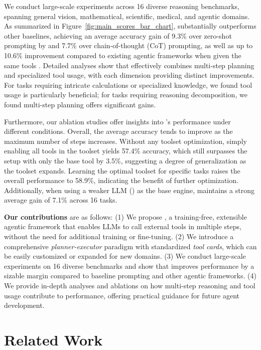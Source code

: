 We conduct large-scale experiments across 16 diverse reasoning benchmarks, spanning general vision, mathematical, scientific, medical, and agentic domains. As summarized in Figure~\ref{fig:main_scores_bar_chart}, \model substantially outperforms other baselines, achieving an average accuracy gain of 9.3\% over zero-shot prompting by \gpt and 7.7\% over chain-of-thought (CoT) prompting, as well as up to 10.6\% improvement compared to existing agentic frameworks when given the same tools \citep{autogen, gpt4oplugin, langchain}. Detailed analyses show that \model effectively combines multi-step planning and specialized tool usage, with each dimension providing distinct improvements. For tasks requiring intricate calculations or specialized knowledge, we found tool usage is particularly beneficial; for tasks requiring reasoning decomposition, we found multi-step planning offers significant gains.

Furthermore, our ablation studies offer insights into \model's performance under different conditions. Overall, the average accuracy tends to improve as the
maximum number of steps increases. Without any toolset optimization, simply enabling all tools in the toolset yields 57.4\% accuracy, which still surpasses the setup with only the base tool by 3.5\%, suggesting a degree of generalization as the toolset expands. Learning the optimal toolset for specific tasks raises the overall performance to 58.9\%, indicating the benefit of further optimization. Additionally, when using a weaker LLM (\gptmini) as the base engine, \model maintains a strong average gain of 7.1\% across 16 tasks.

\textbf{Our contributions} are as follows: (1) We propose \model, a training-free, extensible agentic framework that enables LLMs to call external tools in multiple steps, without the need for additional training or fine-tuning. (2) We introduce a comprehensive \textit{planner-executor }paradigm with standardized \textit{tool cards}, which can be easily customized or expanded for new domains. (3) We conduct large-scale experiments on 16 diverse benchmarks and show that \model improves performance by a sizable margin compared to baseline prompting and other agentic frameworks. (4) We provide in-depth analyses and ablations on how multi-step reasoning and tool usage contribute to performance, offering practical guidance for future agent development. 


\section{Related Work}
\label{sec:related}

